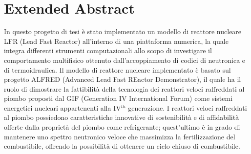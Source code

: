 \chapter*{Extended Abstract}




In questo progetto di tesi è stato implementato un modello di reattore nucleare LFR (Lead Fast Reactor) all'interno di una piattaforma numerica, la quale integra differenti strumenti computazionali allo scopo di investigare il comportamento multifisico ottenuto dall'accoppiamento di codici di neutronica e di termoidraulica.
Il modello di reattore nucleare implementato è basato sul progetto ALFRED (Advanced Lead Fast REactor Demonstrator), il quale ha il ruolo di dimostrare la fattibilità della tecnologia dei reattori veloci raffreddati al piombo proposti dal GIF (Generation IV International Forum) come sistemi energetici nucleari appartenenti alla IV$^{th}$ generazione.
I reattori veloci raffreddati al piombo possiedono caratteristiche innovative di sostenibilità e di affidabilità offerte dalla proprietà del piombo come refrigerante; quest'ultimo è in grado di mantenere uno spettro neutronico veloce che massimizza la fertilizzazione del combustibile, offrendo la possibilità di ottenere un ciclo chiuso di combustibile.

